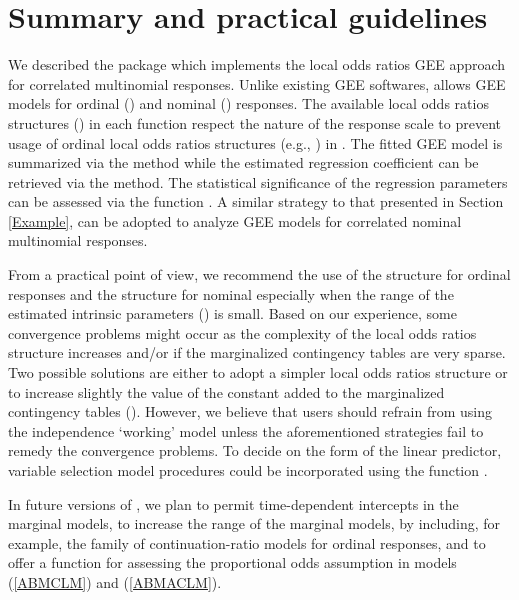 \documentclass[article,shortnames,nojss]{jss}
\begin{document}
\section{Summary and practical guidelines}\label{Summary}
We described the  package  which implements the local odds ratios GEE approach \citep{Touloumis2012} for correlated multinomial responses. Unlike existing GEE softwares,  allows GEE models for ordinal () and nominal () responses. The available local odds ratios structures () in each function respect the nature of the response scale to prevent usage of ordinal local odds ratios structures (e.g., ) in . The fitted GEE model is summarized via the  method while the estimated regression coefficient can be retrieved via the  method. The statistical significance of the regression parameters can be assessed via the function . A similar strategy to that presented in Section \ref{Example}, can be adopted to analyze GEE models for correlated nominal multinomial responses.

From a practical point of view, we recommend the use of the  structure for ordinal responses and the  structure for nominal especially when the range of the estimated intrinsic parameters () is small. Based on our experience, some convergence problems might occur as the complexity of the local odds ratios structure increases and/or if the marginalized contingency tables are very sparse. Two possible solutions are either to adopt a simpler local odds ratios structure or to increase slightly the value of the constant added to the marginalized contingency tables (). However, we believe that users should refrain from using the independence `working' model unless the aforementioned strategies fail to remedy the convergence problems. To decide on the form of the linear predictor, variable selection model procedures could be incorporated using the function . 

In future versions of , we plan to permit time-dependent intercepts in the marginal models, to increase the range of the marginal models, by including, for example, the family of continuation-ratio models for ordinal responses, and to offer a function for assessing the proportional odds assumption in models (\ref{ABMCLM}) and (\ref{ABMACLM}).

 

\end{document}
